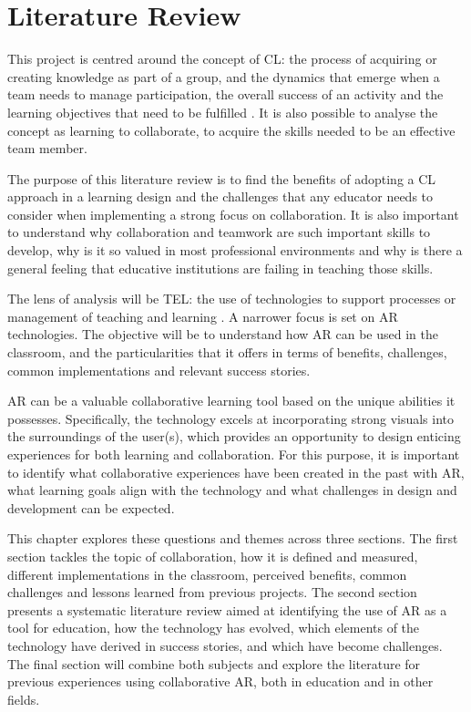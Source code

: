 \chapter{Literature Review \label{ch2}}

This project is centred around the concept of \acf{CL}: the process of acquiring or creating knowledge as part of a group, and the dynamics that emerge when a team needs to manage
participation, the overall success of an activity and the learning objectives that need to be fulfilled \parencite{laal_2012}. It is also possible to analyse the concept as
learning to collaborate, to acquire the skills needed to be an effective team member.

The purpose of this literature review is to find the benefits of adopting a \ac{CL} approach in a learning design and the challenges that any educator needs to consider when
implementing a strong focus on collaboration. It is also important to understand why collaboration and teamwork are such important skills to develop, why is it so valued in
most professional environments and why is there a general feeling that educative institutions are failing in teaching those skills.

The lens of analysis will be \acf{TEL}: the use of technologies to support processes or management of teaching and learning \parencite{passey_2019}. A narrower focus is set on \acf{AR}
technologies. The objective will be to understand how \ac{AR} can be used in the classroom, and the particularities that it offers in terms of benefits, challenges, common
implementations and relevant success stories.

\ac{AR} can be a valuable collaborative learning tool based on the unique abilities it possesses. Specifically, the technology excels at incorporating strong visuals into the surroundings
of the user(s), which provides an opportunity to design enticing experiences for both learning and collaboration. For this purpose, it is important to identify what collaborative
experiences have been created in the past with \ac{AR}, what learning goals align with the technology and what challenges in design and development can be expected.

This chapter explores these questions and themes across three sections. The first section tackles the topic of collaboration, how it is defined and measured, different implementations in
the classroom, perceived benefits, common challenges and lessons learned from previous projects. The second section presents a systematic literature review aimed at identifying the use of
\ac{AR} as a tool for education, how the technology has evolved, which elements of the technology have derived in success stories, and which have become challenges. The final section will
combine both subjects and explore the literature for previous experiences using collaborative \ac{AR}, both in education and in other fields.

